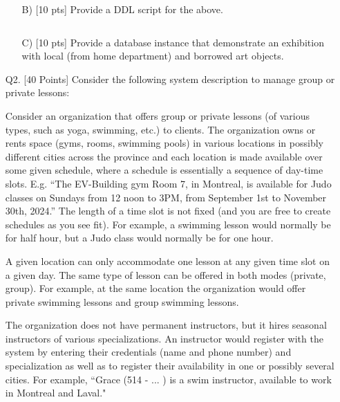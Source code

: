\documentclass[12pt]{article}
\begin{document}
\begin{spacing}{1.5}
\begin{enumerate}
\begin{enumerate}
                        \item[B)] [10 pts] Provide a DDL script for the above.

                              \inputminted[bgcolor=Beige, frame=lines, fontsize=\small, linenos, breaklines]{sql}{q1/db.sql}

                              \newpage

                        \item[C)] [10 pts] Provide a database instance that demonstrate an exhibition with local (from home department) and borrowed art objects.

                  \end{enumerate}

                  \newpage

            \item[Q2.] [40 Points] Consider the following system description to manage group or private lessons:

                  Consider an organization that offers group or private lessons (of various types, such as yoga, swimming, etc.) to clients. The organization owns or rents space (gyms, rooms, swimming pools) in various locations in possibly different cities across the province and each location is made available over some given schedule, where a schedule is essentially a sequence of day-time slots. E.g. “The EV-Building gym Room 7, in Montreal, is available for Judo classes on Sundays from 12 noon to 3PM, from September 1st to November 30th, 2024.” The length of a time slot is not fixed (and you are free to create schedules as you see fit). For example, a swimming lesson would normally be for half hour, but a Judo class would normally be for one hour.

                  A given location can only accommodate one lesson at any given time slot on a given day. The same type of lesson can be offered in both modes (private, group). For example, at the same location the organization would offer private swimming lessons and group swimming lessons.

                  The organization does not have permanent instructors, but it hires seasonal instructors of various specializations. An instructor would register with the system by entering their credentials (name and phone number) and specialization as well as to register their availability in one or possibly several cities. For example, “Grace (514 - ... ) is a swim instructor, available to work in Montreal and Laval."


\end{enumerate}
\end{spacing}
\end{document}

